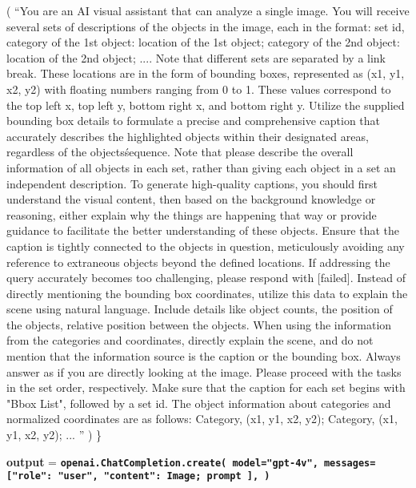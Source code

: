 \documentclass{article}
\renewcommand{\KwSty}[1]{\textnormal{\textcolor{blue!90!black}{\ttfamily\bfseries #1}}\unskip}
\renewcommand{\ArgSty}[1]{\textnormal{\ttfamily #1}\unskip}
\newcommand{\var}{\texttt}
\newcommand{\FuncCall}[2]{\texttt{\bfseries #1(#2)}}
\begin{document}
\begin{algorithm*}[!ht]
    ( \; \hspace{2mm}``You are an AI visual assistant that can analyze a single image. You will receive several sets of descriptions of the objects in the image, each in the format: set id, category of the 1st object: location of the 1st object; category of the 2nd object: location of the 2nd object; .... Note that different sets are separated by a link break. These locations are in the form of bounding boxes, represented as (x1, y1, x2, y2) with floating numbers ranging from 0 to 1. These values correspond to the top left x, top left y, bottom right x, and bottom right y. Utilize the supplied bounding box details to formulate a precise and comprehensive caption that accurately describes the highlighted objects within their designated areas, regardless of the objects\' sequence. Note that please describe the overall information of all objects in each set, rather than giving each object in a set an independent description. To generate high-quality captions, you should first understand the visual content, then based on the background knowledge or reasoning, either explain why the things are happening that way or provide guidance to facilitate the better understanding of these objects. Ensure that the caption is tightly connected to the objects in question, meticulously avoiding any reference to extraneous objects beyond the defined locations.  If addressing the query accurately becomes too challenging, please respond with [failed]. Instead of directly mentioning the bounding box coordinates, utilize this data to explain the scene using natural language.  Include details like object counts, the position of the objects, relative position between the objects.   When using the information from the categories and coordinates, directly explain the scene, and do not mention that the information source is the caption or the bounding box. Always answer as if you are directly looking at the image. Please proceed with the tasks in the set order, respectively. Make sure that the caption for each set begins with "Bbox List", followed by a set id. The object information about categories and normalized coordinates are as follows: \ArgSty{Category, (x1, y1, x2, y2); Category, (x1, y1, x2, y2); ... }'' \;) \; \}
 
\KwSty{output} = \FuncCall{openai.ChatCompletion.create}{ \;
\hspace{13mm}     \var{model="gpt-4v"}, \;
\hspace{5mm}  \var{messages=[{"role": "user", "content": \KwSty{Image}; \KwSty{prompt}} ]}, \;
    }
\end{algorithm*} 
\end{document}
